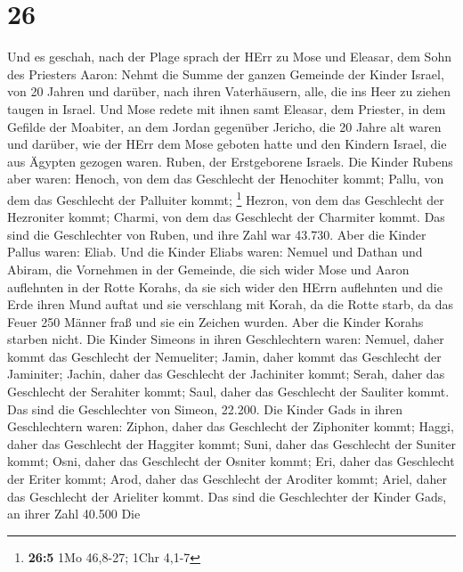 \hypertarget{section-25}{%
\section{26}\label{section-25}}

 Und es geschah, nach der Plage sprach der HErr zu Mose
und Eleasar, dem Sohn des Priesters Aaron:  Nehmt die
Summe der ganzen Gemeinde der Kinder Israel, von 20 Jahren und darüber,
nach ihren Vaterhäusern, alle, die ins Heer zu ziehen taugen in Israel.
 Und Mose redete mit ihnen samt Eleasar, dem Priester, in
dem Gefilde der Moabiter, an dem Jordan gegenüber Jericho,
 die 20 Jahre alt waren und darüber, wie der HErr dem Mose
geboten hatte und den Kindern Israel, die aus Ägypten gezogen waren.
 Ruben, der Erstgeborene Israels. Die Kinder Rubens aber
waren: Henoch, von dem das Geschlecht der Henochiter kommt; Pallu, von
dem das Geschlecht der Palluiter kommt; \footnote{\textbf{26:5} 1Mo
  46,8-27; 1Chr 4,1-7}  Hezron, von dem das Geschlecht der
Hezroniter kommt; Charmi, von dem das Geschlecht der Charmiter kommt.
 Das sind die Geschlechter von Ruben, und ihre Zahl war
43.730.  Aber die Kinder Pallus waren: Eliab.
 Und die Kinder Eliabs waren: Nemuel und Dathan und
Abiram, die Vornehmen in der Gemeinde, die sich wider Mose und Aaron
auflehnten in der Rotte Korahs, da sie sich wider den HErrn auflehnten
 und die Erde ihren Mund auftat und sie verschlang mit
Korah, da die Rotte starb, da das Feuer 250 Männer fraß und sie ein
Zeichen wurden.  Aber die Kinder Korahs starben nicht.
 Die Kinder Simeons in ihren Geschlechtern waren: Nemuel,
daher kommt das Geschlecht der Nemueliter; Jamin, daher kommt das
Geschlecht der Jaminiter; Jachin, daher das Geschlecht der Jachiniter
kommt;  Serah, daher das Geschlecht der Serahiter kommt;
Saul, daher das Geschlecht der Sauliter kommt.  Das sind
die Geschlechter von Simeon, 22.200.  Die Kinder Gads in
ihren Geschlechtern waren: Ziphon, daher das Geschlecht der Ziphoniter
kommt; Haggi, daher das Geschlecht der Haggiter kommt; Suni, daher das
Geschlecht der Suniter kommt;  Osni, daher das Geschlecht
der Osniter kommt; Eri, daher das Geschlecht der Eriter kommt;
 Arod, daher das Geschlecht der Aroditer kommt; Ariel,
daher das Geschlecht der Arieliter kommt.  Das sind die
Geschlechter der Kinder Gads, an ihrer Zahl 40.500  Die
